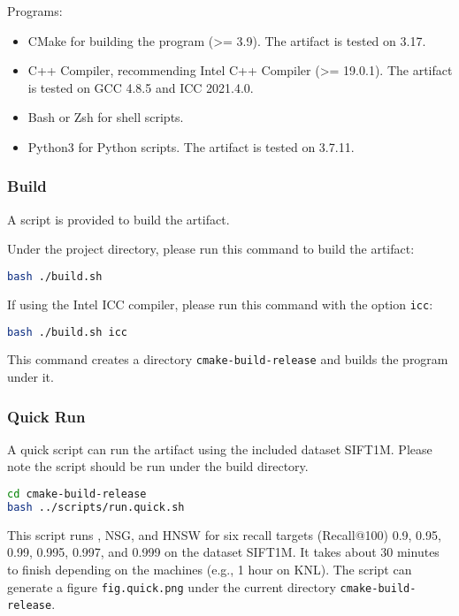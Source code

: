 Programs:
\begin{itemize}
    \item CMake for building the program (>= 3.9). The artifact is tested on 3.17.
    \item C++ Compiler, recommending Intel C++ Compiler (>= 19.0.1). The artifact is tested on GCC 4.8.5 and ICC 2021.4.0.
    \item Bash or Zsh for shell scripts.
    \item Python3 for Python scripts. The artifact is tested on 3.7.11.
\end{itemize}


\subsubsection{Build} \label{subsubsec:build}
A script is provided to build the artifact.

Under the project directory, please run this command to build the artifact:
\begin{lstlisting}[language=bash]
bash ./build.sh
\end{lstlisting}

If using the Intel ICC compiler, please run this command with the option \verb|icc|:
\begin{lstlisting}[language=bash]
bash ./build.sh icc
\end{lstlisting}

This command creates a directory \verb|cmake-build-release| and builds the program under it.


\subsubsection{Quick Run}
A quick script can run the artifact using the included dataset SIFT1M. Please note the script should be run under the build directory.
\begin{lstlisting}[language=bash]
cd cmake-build-release
bash ../scripts/run.quick.sh
\end{lstlisting}

This script runs \Hammer, NSG, and HNSW for six recall targets (Recall@100) 0.9, 0.95, 0.99, 0.995, 0.997, and 0.999 on the dataset SIFT1M. It takes about 30 minutes to finish depending on the machines (e.g., 1 hour on KNL). 
The script can generate a figure \verb|fig.quick.png| under the current directory \verb|cmake-build-release|. 

